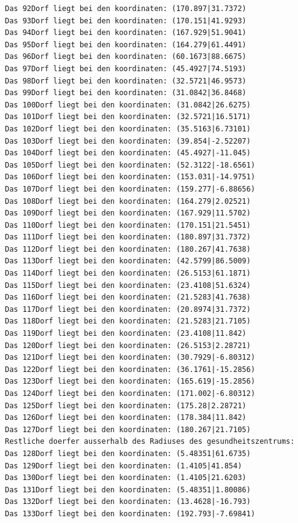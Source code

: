 \documentclass{article}
\begin{document}
\begin{verbatim}
Das 92Dorf liegt bei den koordinaten: (170.897|31.7372)
Das 93Dorf liegt bei den koordinaten: (170.151|41.9293)
Das 94Dorf liegt bei den koordinaten: (167.929|51.9041)
Das 95Dorf liegt bei den koordinaten: (164.279|61.4491)
Das 96Dorf liegt bei den koordinaten: (60.1673|88.6675)
Das 97Dorf liegt bei den koordinaten: (45.4927|74.5193)
Das 98Dorf liegt bei den koordinaten: (32.5721|46.9573)
Das 99Dorf liegt bei den koordinaten: (31.0842|36.8468)
Das 100Dorf liegt bei den koordinaten: (31.0842|26.6275)
Das 101Dorf liegt bei den koordinaten: (32.5721|16.5171)
Das 102Dorf liegt bei den koordinaten: (35.5163|6.73101)
Das 103Dorf liegt bei den koordinaten: (39.854|-2.52207)
Das 104Dorf liegt bei den koordinaten: (45.4927|-11.045)
Das 105Dorf liegt bei den koordinaten: (52.3122|-18.6561)
Das 106Dorf liegt bei den koordinaten: (153.031|-14.9751)
Das 107Dorf liegt bei den koordinaten: (159.277|-6.88656)
Das 108Dorf liegt bei den koordinaten: (164.279|2.02521)
Das 109Dorf liegt bei den koordinaten: (167.929|11.5702)
Das 110Dorf liegt bei den koordinaten: (170.151|21.5451)
Das 111Dorf liegt bei den koordinaten: (180.897|31.7372)
Das 112Dorf liegt bei den koordinaten: (180.267|41.7638)
Das 113Dorf liegt bei den koordinaten: (42.5799|86.5009)
Das 114Dorf liegt bei den koordinaten: (26.5153|61.1871)
Das 115Dorf liegt bei den koordinaten: (23.4108|51.6324)
Das 116Dorf liegt bei den koordinaten: (21.5283|41.7638)
Das 117Dorf liegt bei den koordinaten: (20.8974|31.7372)
Das 118Dorf liegt bei den koordinaten: (21.5283|21.7105)
Das 119Dorf liegt bei den koordinaten: (23.4108|11.842)
Das 120Dorf liegt bei den koordinaten: (26.5153|2.28721)
Das 121Dorf liegt bei den koordinaten: (30.7929|-6.80312)
Das 122Dorf liegt bei den koordinaten: (36.1761|-15.2856)
Das 123Dorf liegt bei den koordinaten: (165.619|-15.2856)
Das 124Dorf liegt bei den koordinaten: (171.002|-6.80312)
Das 125Dorf liegt bei den koordinaten: (175.28|2.28721)
Das 126Dorf liegt bei den koordinaten: (178.384|11.842)
Das 127Dorf liegt bei den koordinaten: (180.267|21.7105)
Restliche doerfer ausserhalb des Radiuses des gesundheitszentrums: 
Das 128Dorf liegt bei den koordinaten: (5.48351|61.6735)
Das 129Dorf liegt bei den koordinaten: (1.4105|41.854)
Das 130Dorf liegt bei den koordinaten: (1.4105|21.6203)
Das 131Dorf liegt bei den koordinaten: (5.48351|1.80086)
Das 132Dorf liegt bei den koordinaten: (13.4628|-16.793)
Das 133Dorf liegt bei den koordinaten: (192.793|-7.69841)

\end{verbatim}
\end{document}
